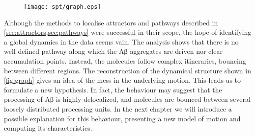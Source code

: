 \begin{figure}
  \texttt{[image: spt/graph.eps]}
  {\label{fig:graph_regions}}
  {\label{fig:graph_network}}
\end{figure}

Although the methods to localise attractors and pathways described in \cref{sec:attractors,sec:pathways} were successful in their scope, the hope of identifying a global dynamics in the data seems vain. The analysis shows that there is no well defined pathway along which the Aβ aggregates are driven nor clear accumulation points. Instead, the molecules follow complex itineraries, bouncing between different regions. The reconstruction of the dynamical structure shown in \cref{fig:graph} gives an idea of the mess in the underlying motion. This leads us to formulate a new hypothesis. In fact, the behaviour may suggest that the processing of Aβ is highly delocalized, and molecules are bounced between several loosely distributed processing units. In the next chapter we will introduce a possible explanation for this behaviour, presenting a new model of motion and computing its characteristics.
